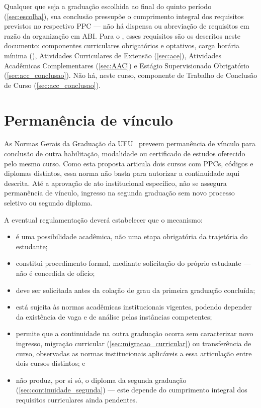 Qualquer que seja a graduação escolhida ao final do quinto período (\autoref{sec:escolha}), sua conclusão pressupõe o cumprimento integral dos requisitos previstos no respectivo PPC — não há dispensa ou abreviação de requisitos em razão da organização em ABI. Para o \ppccurso, esses requisitos são os descritos neste documento: componentes curriculares obrigatórios e optativos, carga horária mínima (\ppctempominimo), Atividades Curriculares de Extensão (\autoref{sec:ace}), Atividades Acadêmicas Complementares (\autoref{sec:AAC}) e Estágio Supervisionado Obrigatório (\autoref{sec:acc_conclusao}). Não há, neste curso, componente de Trabalho de Conclusão de Curso (\autoref{sec:acc_conclusao}).

\section{Permanência de vínculo}
\label{sec:permanencia}

As Normas Gerais da Graduação da UFU~\cite{ufu_congrad_46_2022} preveem permanência de vínculo para conclusão de outra habilitação, modalidade ou certificado de estudos oferecido pelo mesmo curso. Como esta proposta articula dois cursos com PPCs, códigos e diplomas distintos, essa norma não basta para autorizar a continuidade aqui descrita. Até a aprovação de ato institucional específico, não se assegura permanência de vínculo, ingresso na segunda graduação sem novo processo seletivo ou segundo diploma.

A eventual regulamentação deverá estabelecer que o mecanismo:

\begin{itemize}
    \item é uma possibilidade acadêmica, não uma etapa obrigatória da trajetória do estudante;
    \item constitui procedimento formal, mediante solicitação do próprio estudante — não é concedida de ofício;
    \item deve ser solicitada antes da colação de grau da primeira graduação concluída;
    \item está sujeita às normas acadêmicas institucionais vigentes, podendo depender da existência de vaga e de análise pelas instâncias competentes;
    \item permite que a continuidade na outra graduação ocorra sem caracterizar novo ingresso, migração curricular (\autoref{sec:migracao_curricular}) ou transferência de curso, observadas as normas institucionais aplicáveis a essa articulação entre dois cursos distintos; e
    \item não produz, por si só, o diploma da segunda graduação (\autoref{sec:continuidade_segunda}) — este depende do cumprimento integral dos requisitos curriculares ainda pendentes.
\end{itemize}

